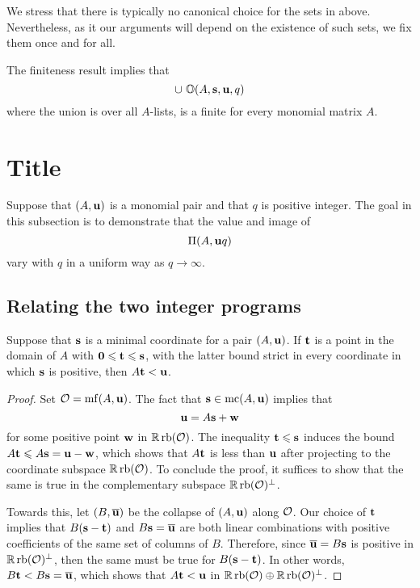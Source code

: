 \documentclass[11pt]{amsart}
\renewcommand{\!}[1]{{\color{red}\text{$\star$\,}#1\,$\star$}}
\newcommand{\ol}[1]{\overline{#1}}
\begin{document}
\begin{remark}
We stress that there is typically no canonical choice for the sets in  above.  Nevertheless, as it our arguments will depend on the existence of such sets, we fix them once and for all.
\end{remark}

\begin{remark}
\label{finiteness of optimal reps: R}
The finiteness result  implies that \[ \cup  \ \mathbb{O}( A, \mathbf{s}, \mathbf{u}, q ) \] where the union is over all $A$-lists, is a finite for every monomial matrix $A$.
\end{remark}

\newpage
\section{Title}
\label{solving: S}

Suppose that $(A, \mathbf{u})$ is a monomial pair and that $q$ is positive integer. The goal in this subsection is to demonstrate that the value and image of \[ \Pi(A, \mathbf{u}q) \] vary with $q$ in a uniform way as $q \to \infty$.

\subsection{Relating the two integer programs}
\label{relating-programs: ss}

\begin{lemma}
\label{less than u: L}  Suppose that $\mathbf{s}$ is a minimal coordinate for a pair $(A, \mathbf{u})$.  If $\mathbf{t}$ is a point in the domain of $A$ with $\mathbf{0} \leqslant \mathbf{t} \leqslant \mathbf{s}$, with the latter bound strict in every coordinate in which $\mathbf{s}$ is positive, then $A \mathbf{t} < \mathbf{u}$.
\end{lemma}

\begin{proof}  Set $\mathcal{O} = \operatorname{mf}(A, \mathbf{u})$.  The fact that $\mathbf{s} \in \operatorname{mc}(A, \mathbf{u})$  implies that \[ \mathbf{u} = A \mathbf{s} + \mathbf{w}\] for some positive point $\mathbf{w}$ in $\mathbb{R} \operatorname{rb}(\mathcal{O})$.     The inequality $\mathbf{t} \leqslant \mathbf{s}$ induces the bound $A \mathbf{t} \leqslant A \mathbf{s} = \mathbf{u} - \mathbf{w}$, which shows that $A\mathbf{t}$ is less than $\mathbf{u}$ after projecting to the coordinate subspace $\mathbb{R} \operatorname{rb}(\mathcal{O})$.  To conclude the proof, it suffices to show that the same is true in the complementary subspace $\mathbb{R} \operatorname{rb}(\mathcal{O})^{\perp}$.  

Towards this, let $(B,\ol{\vv{u}})$ be the collapse of $(A,\mathbf{u})$ along $\mathcal{O}$.  Our choice of $\mathbf{t}$ implies that $B( \mathbf{s} - \mathbf{t})$ and $B \vv{s} = \ol{\vv{u}}$ are both linear combinations with positive coefficients of the same set of columns of $B$.  Therefore, since $\ol{\vv{u}} = B \vv{s}$ is positive in $\mathbb{R} \operatorname{rb}(\mathcal{O})^{\perp}$, then the same must be true for $B(\mathbf{s} - \mathbf{t})$.  In other words, $B \vv{t} < B \vv{s} = \ol{\vv{u}}$, which shows that $A \mathbf{t} < \mathbf{u}$ in $\mathbb{R} \operatorname{rb}(\mathcal{O}) \oplus \mathbb{R} \operatorname{rb}(\mathcal{O})^{\perp}$.
\end{proof}
\end{document}

